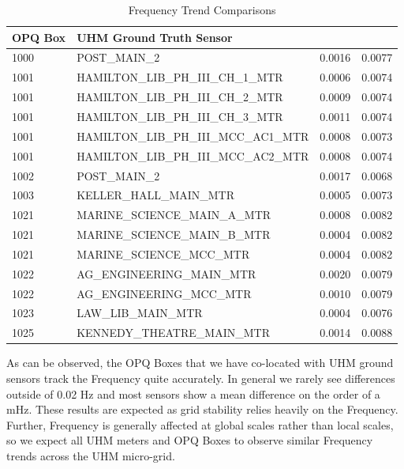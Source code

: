 \begin{table}[H]
    \centering
    \caption{Frequency Trend Comparisons}
    \begin{tabularx}{\textwidth}{lXll}
        \toprule
        \textbf{OPQ Box} & \textbf{UHM Ground Truth Sensor} & \boldmath{$\mu$} & \boldmath{$\sigma$} \\
        \midrule
        1000 & POST\_MAIN\_2 & 0.0016 & 0.0077 \\
        1001 & HAMILTON\_LIB\_PH\_III\_CH\_1\_MTR & 0.0006 & 0.0074 \\
        1001 & HAMILTON\_LIB\_PH\_III\_CH\_2\_MTR & 0.0009 & 0.0074 \\
        1001 & HAMILTON\_LIB\_PH\_III\_CH\_3\_MTR & 0.0011 & 0.0074 \\
        1001 & HAMILTON\_LIB\_PH\_III\_MCC\_AC1\_MTR & 0.0008 & 0.0073 \\
        1001 & HAMILTON\_LIB\_PH\_III\_MCC\_AC2\_MTR & 0.0008 & 0.0074 \\
        1002 & POST\_MAIN\_2 & 0.0017 & 0.0068 \\
        1003 & KELLER\_HALL\_MAIN\_MTR & 0.0005 & 0.0073 \\
        1021 & MARINE\_SCIENCE\_MAIN\_A\_MTR & 0.0008 & 0.0082 \\
        1021 & MARINE\_SCIENCE\_MAIN\_B\_MTR & 0.0004 & 0.0082 \\
        1021 & MARINE\_SCIENCE\_MCC\_MTR & 0.0004 & 0.0082 \\
        1022 & AG\_ENGINEERING\_MAIN\_MTR & 0.0020 & 0.0079 \\
        1022 & AG\_ENGINEERING\_MCC\_MTR & 0.0010 & 0.0079 \\
        1023 & LAW\_LIB\_MAIN\_MTR & 0.0004 & 0.0076 \\
        1025 & KENNEDY\_THEATRE\_MAIN\_MTR & 0.0014 & 0.0088 \\
        \bottomrule
    \end{tabularx}
    \label{table:gt_f}
\end{table}

As can be observed, the OPQ Boxes that we have co-located with UHM ground sensors track the Frequency quite accurately. In general we rarely see differences outside of 0.02 Hz and most sensors show a mean difference on the order of a mHz. These results are expected as grid stability relies heavily on the Frequency. Further, Frequency is generally affected at global scales rather than local scales, so we expect all UHM meters and OPQ Boxes to observe similar Frequency trends across the UHM micro-grid.

